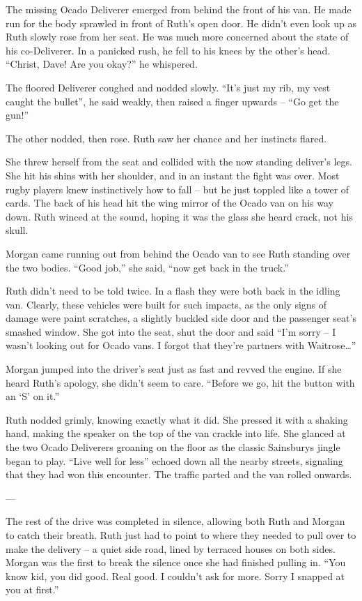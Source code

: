 The missing Ocado Deliverer emerged from behind the front of his van. He made run for the body sprawled in front of Ruth’s open door. He didn’t even look up as Ruth slowly rose from her seat. He was much more concerned about the state of his co-Deliverer. In a panicked rush, he fell to his knees by the other’s head. “Christ, Dave! Are you okay?” he whispered.

The floored Deliverer coughed and nodded slowly. “It’s just my rib, my vest caught the bullet”, he said weakly, then raised a finger upwards – “Go get the gun!”

The other nodded, then rose. Ruth saw her chance and her instincts flared. 

She threw herself from the seat and collided with the now standing deliver’s legs. She hit his shins with her shoulder, and in an instant the fight was over. Most rugby players knew instinctively how to fall – but he just toppled like a tower of cards. The back of his head hit the wing mirror of the Ocado van on his way down. Ruth winced at the sound, hoping it was the glass she heard crack, not his skull. 

Morgan came running out from behind the Ocado van to see Ruth standing over the two bodies. “Good job,” she said, “now get back in the truck.” 

Ruth didn’t need to be told twice. In a flash they were both back in the idling van. Clearly, these vehicles were built for such impacts, as the only signs of damage were paint scratches, a slightly buckled side door and the passenger seat’s smashed window. She got into the seat, shut the door and said “I’m sorry – I wasn’t looking out for Ocado vans. I forgot that they’re partners with Waitrose…”

Morgan jumped into the driver’s seat just as fast and revved the engine. If she heard Ruth’s apology, she didn’t seem to care. “Before we go, hit the button with an ‘S’ on it.”

Ruth nodded grimly, knowing exactly what it did. She pressed it with a shaking hand, making the speaker on the top of the van crackle into life. She glanced at the two Ocado Deliverers groaning on the floor as the classic Sainsburys jingle began to play. “Live well for less” echoed down all the nearby streets, signaling that they had won this encounter. The traffic parted and the van rolled onwards. 

---

The rest of the drive was completed in silence, allowing both Ruth and Morgan to catch their breath. Ruth just had to point to where they needed to pull over to make the delivery – a quiet side road, lined by terraced houses on both sides. Morgan was the first to break the silence once she had finished pulling in. “You know kid, you did good. Real good. I couldn’t ask for more. Sorry I snapped at you at first.”

